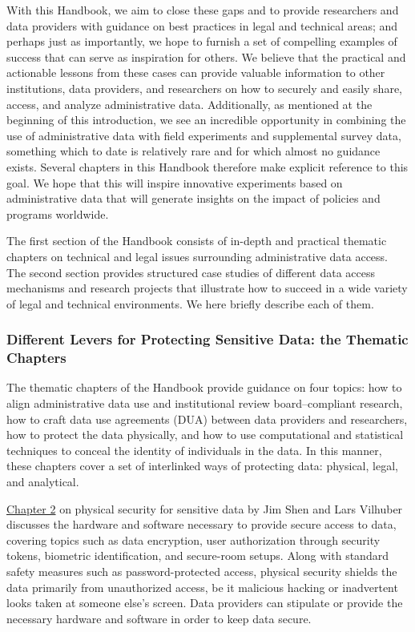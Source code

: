 \documentclass[
]{WileySix}
\begin{document}
With this Handbook, we aim to close these gaps and to provide researchers and data providers with guidance on best practices in legal and technical areas; and perhaps just as importantly, we hope to furnish a set of compelling examples of success that can serve as inspiration for others. We believe that the practical and actionable lessons from these cases can provide valuable information to other institutions, data providers, and researchers on how to securely and easily share, access, and analyze administrative data. Additionally, as mentioned at the beginning of this introduction, we see an incredible opportunity in combining the use of administrative data with field experiments and supplemental survey data, something which to date is relatively rare and for which almost no guidance exists. Several chapters in this Handbook therefore make explicit reference to this goal. We hope that this will inspire innovative experiments based on administrative data that will generate insights on the impact of policies and programs worldwide.

The first section of the Handbook consists of in-depth and practical thematic chapters on technical and legal issues surrounding administrative data access. The second section provides structured case studies of different data access mechanisms and research projects that illustrate how to succeed in a wide variety of legal and technical environments. We here briefly describe each of them.

\hypertarget{different-levers-for-protecting-sensitive-data-the-thematic-chapters}{%
\subsubsection{Different Levers for Protecting Sensitive Data: the Thematic Chapters}\label{different-levers-for-protecting-sensitive-data-the-thematic-chapters}}

The thematic chapters of the Handbook provide guidance on four topics: how to align administrative data use and institutional review board--compliant research, how to craft data use agreements (DUA) between data providers and researchers, how to protect the data physically, and how to use computational and statistical techniques to conceal the identity of individuals in the data. In this manner, these chapters cover a set of interlinked ways of protecting data: physical, legal, and analytical.

\protect\hyperlink{security}{Chapter 2} on physical security for sensitive data by Jim Shen and Lars Vilhuber discusses the hardware and software necessary to provide secure access to data, covering topics such as data encryption, user authorization through security tokens, biometric identification, and secure-room setups. Along with standard safety measures such as password-protected access, physical security shields the data primarily from unauthorized access, be it malicious hacking or inadvertent looks taken at someone else's screen. Data providers can stipulate or provide the necessary hardware and software in order to keep data secure.
\end{document}
